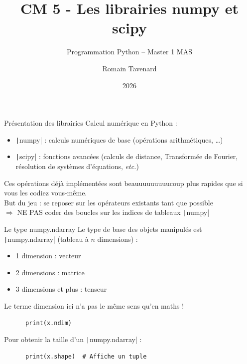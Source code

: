 \documentclass[10pt]{beamer}
\title[M1 MAS -- Python -- numpy]{CM 5 - Les librairies numpy et scipy}
\subtitle{Programmation Python -- Master 1 MAS}
\author{Romain Tavenard}
\date{2026}
\institute{%
\hypersetup{urlcolor=.}
\makebox[2.2ex][c]{\faEnvelope}\enspace\href{mailto:romain.tavenard@univ-rennes2.fr}{\texttt{romain.tavenard@univ-rennes2.fr}}\\%
}
\begin{document}
\maketitle

\begin{frame}[fragile]{Présentation des librairies}  
  Calcul numérique en Python :
  \begin{itemize}
    \item \texttt|numpy| : calculs numériques de base (opérations arithmétiques, \dots)
    \item \texttt|scipy| : fonctions avancées (calculs de distance, Transformée de Fourier, résolution de systèmes d'équations, \emph{etc.})
  \end{itemize}

  \pause

  Ces opérations déjà implémentées sont \alert{beauuuuuuuuucoup} plus rapides que si vous les codiez vous-même. \\
  \alert{But du jeu :} se reposer sur les opérateurs existants tant que possible \\
  $\Rightarrow$ \alert{NE PAS} coder des boucles sur les indices de tableaux \texttt|numpy|

\end{frame}

\begin{frame}[fragile]{Le type numpy.ndarray}  
  Le type de base des objets manipulés est \texttt|numpy.ndarray| (tableau à $n$ dimensions) :
  \begin{itemize}
    \item 1 dimension : vecteur
    \item 2 dimensions : matrice
    \item 3 dimensions et plus : tenseur
  \end{itemize}

  \alert{Le terme dimension ici n'a pas le même sens qu'en maths !}

  \begin{beamercodeblock}
    \begin{verbatim}
      print(x.ndim)
    \end{verbatim}
  \end{beamercodeblock}

  Pour obtenir la taille d'un \texttt|numpy.ndarray| : 

  \begin{beamercodeblock}
    \begin{verbatim}
      print(x.shape)  # Affiche un tuple
    \end{verbatim}
  \end{beamercodeblock}
\end{frame}
\end{document}
